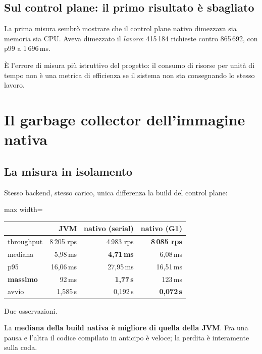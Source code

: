 \subsection{Sul control plane: il primo risultato \`e sbagliato}

La prima misura sembr\`o mostrare che il control plane nativo dimezzava sia
memoria sia CPU. Aveva dimezzato il \emph{lavoro}: 415\,184 richieste contro
865\,692, con p99 a 1\,696\,ms.

\`E l'errore di misura pi\`u istruttivo del progetto: il consumo di risorse per
unit\`a di tempo non \`e una metrica di efficienza se il sistema non sta
consegnando lo stesso lavoro.

\section{Il garbage collector dell'immagine nativa}

\subsection{La misura in isolamento}

Stesso backend, stesso carico, unica differenza la build del control plane:

\begin{center}
\small
\begin{adjustbox}{max width=\textwidth}
\begin{tabular}{@{}lrrr@{}}
\toprule
 & \textbf{JVM} & \textbf{nativo (serial)} & \textbf{nativo (G1)} \\
\midrule
throughput & 8\,205 rps & 4\,983 rps & \textbf{8\,085 rps} \\
mediana & 5{,}98\,ms & \textbf{4{,}71\,ms} & 6{,}08\,ms \\
p95 & 16{,}06\,ms & 27{,}95\,ms & 16{,}51\,ms \\
\textbf{massimo} & 92\,ms & \textbf{1{,}77\,s} & 123\,ms \\
avvio & 1{,}585\,s & 0{,}192\,s & \textbf{0{,}072\,s} \\
\bottomrule
\end{tabular}
\end{adjustbox}
\end{center}

Due osservazioni.

La \textbf{mediana della build nativa \`e migliore di quella della JVM}. Fra una
pausa e l'altra il codice compilato in anticipo \`e veloce; la perdita \`e
interamente sulla coda.


